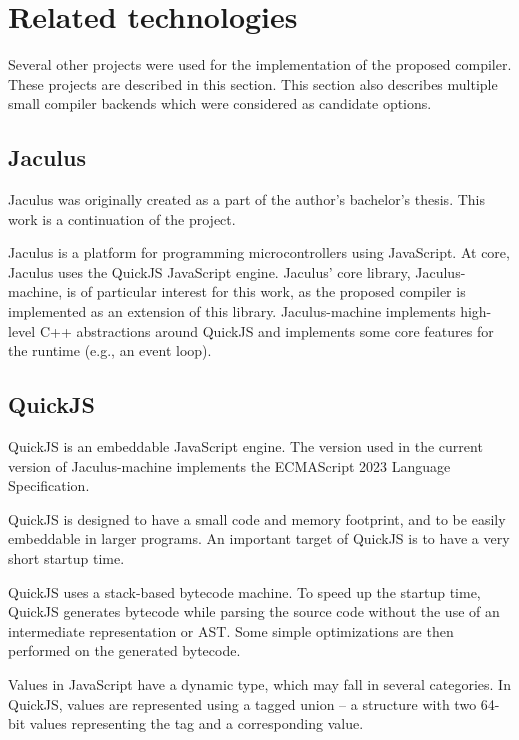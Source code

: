 

\section{Related technologies}

Several other projects were used for the implementation of the proposed compiler. These projects are described in this section. This section also describes multiple small compiler backends which were considered as candidate options.

\subsection{Jaculus}\label{jaculus}

Jaculus was originally created as a part of the author's bachelor's thesis\cite{jaculusthesis}. This work is a continuation of the project.

Jaculus is a platform for programming microcontrollers using JavaScript. At core, Jaculus uses the QuickJS JavaScript engine. Jaculus' core library, Jaculus-machine, is of particular interest for this work, as the proposed compiler is implemented as an extension of this library. Jaculus-machine implements high-level C++ abstractions around QuickJS and implements some core features for the runtime (e.g., an event loop).

\subsection{QuickJS}

QuickJS is an embeddable JavaScript engine. The version used in the current version of Jaculus-machine implements the ECMAScript 2023 Language Specification\cite{ecma262}.

QuickJS is designed to have a small code and memory footprint, and to be easily embeddable in larger programs. An important target of QuickJS is to have a very short startup time.

QuickJS uses a stack-based bytecode machine. To speed up the startup time, QuickJS generates bytecode while parsing the source code without the use of an intermediate representation or AST. Some simple optimizations are then performed on the generated bytecode.

Values in JavaScript have a dynamic type, which may fall in several categories. In QuickJS, values are represented using a tagged union -- a structure with two 64-bit values representing the tag and a corresponding value.

